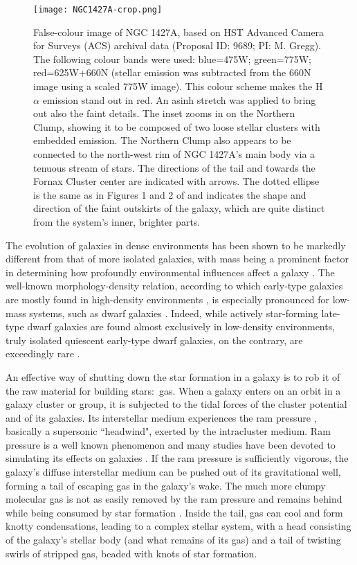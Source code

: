 \begin{figure*}
\centering
\texttt{[image: NGC1427A-crop.png]}
\caption{False-colour image of NGC 1427A, based on HST Advanced Camera for Surveys (ACS) archival data (Proposal ID: 9689; PI: M. Gregg).
The following colour bands were used: blue=475W; green=775W; red=625W+660N (stellar emission was subtracted from the 660N image using a scaled 775W image).
This colour scheme makes the H$\alpha$ emission stand out in red. An asinh stretch was applied to bring out also the faint details.
The inset zooms in on the Northern Clump, showing it to be composed of two loose stellar clusters with embedded \Hii{} emission.
The Northern Clump also appears to be connected to the north-west rim of NGC 1427A's main body via a tenuous stream of stars.
The directions of the \Hi{} tail and towards the Fornax Cluster center are indicated with arrows.
The dotted ellipse is the same as in Figures 1 and 2 of \citet{Lee-Waddell2018} and indicates the shape and direction of the faint outskirts of the galaxy, which are quite distinct from the system's inner, brighter parts.
}
\label{fig:NGC1427A}
\end{figure*}
The evolution of galaxies in dense environments has been shown to be markedly different from that of more isolated galaxies, with mass being a prominent factor in determining how profoundly environmental influences affect a galaxy \citep{Boselli2006, Grossi2018a}. 
The well-known morphology-density relation, according to which early-type galaxies are mostly found in high-density environments \citep{Dressler1980, Dressler1997}, is especially pronounced for low-mass systems, such as dwarf galaxies \citep{McConnachie2012}.
Indeed, while actively star-forming late-type dwarf galaxies are found almost exclusively in low-density environments, truly isolated quiescent early-type dwarf galaxies, on the contrary, are exceedingly rare \citep{Binggeli1990, Karachentseva2010, Geha2012}.

An effective way of shutting down the star formation in a galaxy is to rob it of the raw material for building stars:~gas. 
When a galaxy enters on an orbit in a galaxy cluster or group, it is subjected to the tidal forces of the cluster potential and of its galaxies. 
Its interstellar medium experiences the ram pressure \citep{GunnGott1972}, basically a supersonic ``headwind", exerted by the intracluster medium.
Ram pressure is a well known phenomenon and many studies have been devoted to simulating its effects on galaxies \citep[e.g.:][]{Mori2000, Mayer2006, Roediger2008, Roediger2015, Steinhauser2016, Yun2018, Steyrleithner2020}.
If the ram pressure is sufficiently vigorous, the galaxy's diffuse interstellar medium can be pushed out of its gravitational well, forming a tail of escaping \Hi{} gas in the galaxy's wake.
The much more clumpy molecular gas is not as easily removed by the ram pressure and remains behind while being consumed by star formation \citep{Abramson2014, Lee2017, Wang2020}. 
Inside the tail, gas can cool and form knotty condensations, leading to a complex stellar system, with a head consisting of the galaxy's stellar body (and what remains of its gas) and a tail of twisting swirls of stripped gas, beaded with knots of star formation.

